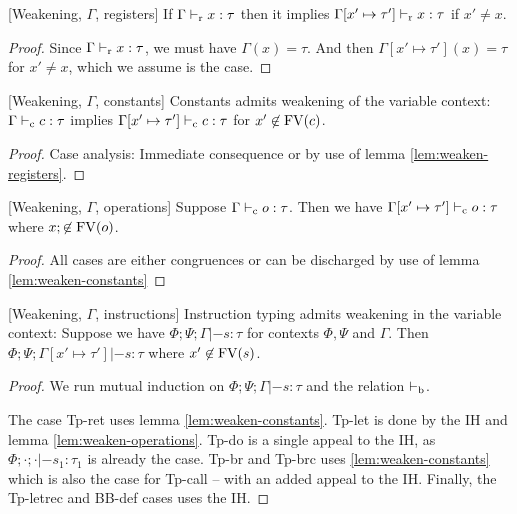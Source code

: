 \documentclass[a4paper, oneside, 10pt, final]{memoir}
\begin{document}
\begin{lem}{[Weakening, $\Gamma$, registers]}
  \label{lem:weaken-registers}
  If $\Gamma |-_{\mathrm{r}} x : \tau$ then it implies $\Gamma[x' \mapsto \tau']
  |-_{\mathrm{r}} x : \tau$ if $x' \neq x$.
\end{lem}
\begin{proof}
  Since $\Gamma |-_{\mathrm{r}} x : \tau$, we must have $\Gamma(x) = \tau$. And
  then $\Gamma[x' \mapsto \tau'](x) = \tau$ for $x' \neq x$, which we
  assume is the case.
\end{proof}
\begin{lem}{[Weakening, $\Gamma$, constants]}
  \label{lem:weaken-constants}
  Constants admits weakening of the variable context: $\Gamma |-_{\mathrm{c}} c :
  \tau$ implies $\Gamma[x' \mapsto \tau'] |-_{\mathrm{c}} c : \tau$ for $x' \not
  \in \mathrm{FV}(c)$.
\end{lem}
\begin{proof}
  Case analysis: Immediate consequence or by use of lemma \ref{lem:weaken-registers}.
\end{proof}
\begin{lem}{[Weakening, $\Gamma$, operations]}
  \label{lem:weaken-operations}
  Suppose $\Gamma |-_{\mathrm{c}} o : \tau$. Then we have $\Gamma[x' \mapsto
  \tau'] |-_{\mathrm{c}} o : \tau$ where $x; \not \in \mathrm{FV}(o)$.
\end{lem}
\begin{proof}
  All cases are either congruences or can be discharged by use of
  lemma \ref{lem:weaken-constants}
\end{proof}
\begin{lem}{[Weakening, $\Gamma$, instructions]}
  \label{lem:weaken-gamma}
  Instruction typing admits weakening in the variable context: Suppose
  we have $\Phi;\Psi;\Gamma |- s : \tau$ for contexts $\Phi, \Psi$ and
  $\Gamma$. Then $\Phi;\Psi;\Gamma[x' \mapsto \tau'] |- s : \tau$
  where $x' \not \in \mathrm{FV}(s)$.
\end{lem}
\begin{proof}
  We run mutual induction on $\Phi;\Psi;\Gamma |- s : \tau$ and the
  relation $|-_{\mathrm{b}}$.

  The case Tp-ret uses lemma \ref{lem:weaken-constants}. Tp-let is
  done by the IH and lemma \ref{lem:weaken-operations}. Tp-do is a
  single appeal to the IH, as $\Phi;\cdot;\cdot |- s_1 : \tau_1$ is
  already the case. Tp-br and Tp-brc uses \ref{lem:weaken-constants}
  which is also the case for Tp-call -- with an added appeal to the
  IH. Finally, the Tp-letrec and BB-def cases uses the IH.
\end{proof}
\end{document}
